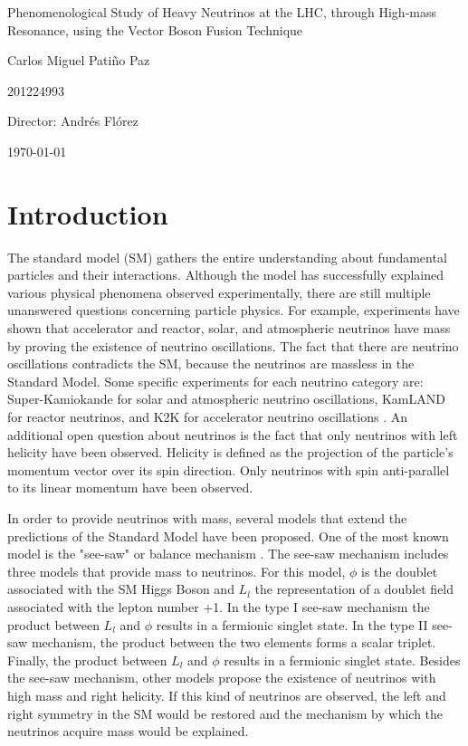 \documentclass[12pt]{article}
\begin{document}
\begin{center}
\Huge
Phenomenological Study of Heavy Neutrinos at the LHC, through High-mass Resonance, using the Vector Boson Fusion Technique

\vspace{3mm}
\Large Carlos Miguel Patiño Paz

\large
201224993


\vspace{2mm}
\Large
Director: Andrés Flórez

\normalsize
\vspace{2mm}

\today
\end{center}


\normalsize
\section{Introduction}

The standard model (SM) gathers the entire understanding about fundamental particles and their interactions. Although the model has successfully explained various physical phenomena observed experimentally, there are still multiple unanswered questions concerning particle physics. For example, experiments \cite{Detectores} have shown that accelerator and reactor, solar, and atmospheric neutrinos have mass by proving the existence of neutrino oscillations. The fact that there are neutrino oscillations contradicts the SM, because the neutrinos are massless in the Standard Model. Some specific experiments for each neutrino category are: Super-Kamiokande \cite{Super-Kamiokande} for solar and atmospheric neutrino oscillations, KamLAND \cite{KamLAND} for reactor neutrinos, and K2K \cite{K2K} for accelerator neutrino oscillations \cite{Experimentos}. An additional open question about neutrinos is the fact that only neutrinos with left helicity have been observed. Helicity is defined as the projection of the particle's momentum vector over its spin direction. Only neutrinos with spin anti-parallel to its linear momentum have been observed.

In order to provide neutrinos with mass, several models that extend the predictions of the Standard Model have been proposed. One of the most known model is the "see-saw" or balance mechanism \cite{See-saw}. The see-saw mechanism includes three models that provide mass to neutrinos. For this model, $\phi$ is the doublet associated with the SM Higgs Boson and $L_{l}$ the representation of a doublet field associated with the lepton number +1. In the type I see-saw mechanism the product between $L_{l}$ and $\phi$ results in a fermionic singlet state. In the type II see-saw mechanism, the product between the two elements forms a scalar triplet. Finally, the product between $L_{l}$ and $\phi$ results in a fermionic singlet state. Besides the see-saw mechanism, other models propose the existence of neutrinos with high mass and right helicity. If this kind of neutrinos are observed, the left and right symmetry in the SM would be restored and the mechanism by which the neutrinos acquire mass would be explained. 
\end{document}
